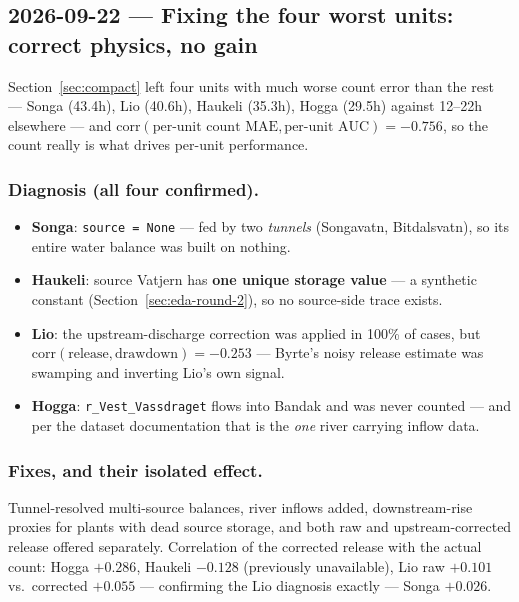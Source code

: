 \subsection{2026-09-22 --- Fixing the four worst units: correct physics, no gain}
\label{sec:v2rejected}

Section~\ref{sec:compact} left four units with much worse count error than the rest --- Songa
(43.4h), Lio (40.6h), Haukeli (35.3h), Hogga (29.5h) against 12--22h elsewhere --- and
$\text{corr}(\text{per-unit count MAE}, \text{per-unit AUC}) = -0.756$, so the count really is what
drives per-unit performance.

\subsubsection*{Diagnosis (all four confirmed).}
\begin{itemize}\itemsep1pt
  \item \textbf{Songa}: \texttt{source = None} --- fed by two \emph{tunnels} (Songavatn,
        Bitdalsvatn), so its entire water balance was built on nothing.
  \item \textbf{Haukeli}: source Vatjern has \textbf{one unique storage value} --- a synthetic
        constant (Section~\ref{sec:eda-round-2}), so no source-side trace exists.
  \item \textbf{Lio}: the upstream-discharge correction was applied in 100\% of cases, but
        $\text{corr}(\text{release}, \text{drawdown}) = -0.253$ --- Byrte's noisy release estimate
        was swamping and inverting Lio's own signal.
  \item \textbf{Hogga}: \texttt{r\_Vest\_Vassdraget} flows into Bandak and was never counted --- and
        per the dataset documentation that is the \emph{one} river carrying inflow data.
\end{itemize}

\subsubsection*{Fixes, and their isolated effect.}
Tunnel-resolved multi-source balances, river inflows added, downstream-rise proxies for plants
with dead source storage, and both raw and upstream-corrected release offered separately.
Correlation of the corrected release with the actual count: Hogga $+0.286$, Haukeli $-0.128$
(previously unavailable), Lio raw $+0.101$ vs.\ corrected $+0.055$ --- confirming the Lio diagnosis
exactly --- Songa $+0.026$.

